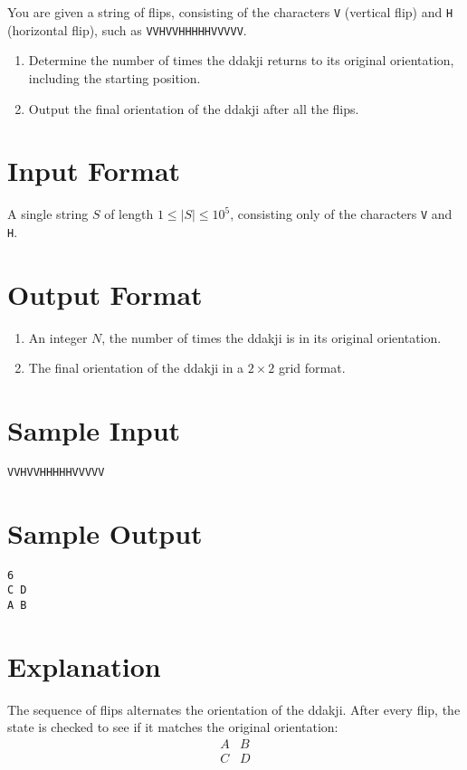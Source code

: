 \documentclass[12pt]{article}
\begin{document}
You are given a string of flips, consisting of the characters \texttt{V} (vertical flip) and \texttt{H} (horizontal flip), such as \texttt{VVHVVHHHHHVVVVV}. 

\begin{enumerate}
    \item Determine the number of times the ddakji returns to its original orientation, including the starting position.
    \item Output the final orientation of the ddakji after all the flips.
\end{enumerate}

\section*{Input Format}
A single string $S$ of length $1 \leq |S| \leq 10^5$, consisting only of the characters \texttt{V} and \texttt{H}.

\section*{Output Format}
\begin{enumerate}
    \item An integer $N$, the number of times the ddakji is in its original orientation.
    \item The final orientation of the ddakji in a $2 \times 2$ grid format.
\end{enumerate}

\section*{Sample Input}
\texttt{VVHVVHHHHHVVVVV}

\section*{Sample Output}
\begin{verbatim}
6
C D
A B
\end{verbatim}

\section*{Explanation}
The sequence of flips alternates the orientation of the ddakji. After every flip, the state is checked to see if it matches the original orientation:
\[
\begin{array}{cc}
A & B \\
C & D \\
\end{array}
\]
\end{document}
